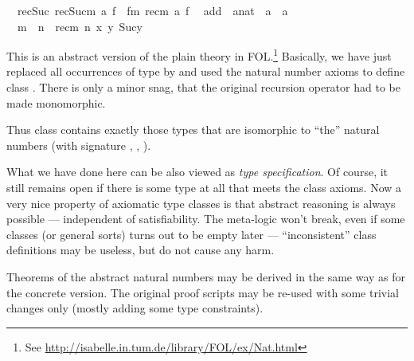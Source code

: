 \begin{isabellebody}
\ \ rec{\isacharunderscore}Suc{\isacharcolon}\ {\isachardoublequote}rec{\isacharparenleft}Suc{\isacharparenleft}m{\isacharparenright}{\isacharcomma}\ a{\isacharcomma}\ f{\isacharparenright}\ {\isacharequal}\ f{\isacharparenleft}m{\isacharcomma}\ rec{\isacharparenleft}m{\isacharcomma}\ a{\isacharcomma}\ f{\isacharparenright}{\isacharparenright}{\isachardoublequote}\isanewline
\isanewline
{}\isanewline
\ \ add\ {\isacharcolon}{\isacharcolon}\ {\isachardoublequote}{\isacharprime}a{\isacharcolon}{\isacharcolon}nat\ {\isasymRightarrow}\ {\isacharprime}a\ {\isasymRightarrow}\ {\isacharprime}a{\isachardoublequote}\ \ \ \ {\isacharparenleft}\ {\isachardoublequote}{\isacharplus}{\isachardoublequote}\ {}{}{\isacharparenright}\isanewline
\ \ {\isachardoublequote}m\ {\isacharplus}\ n\ {\isasymequiv}\ rec{\isacharparenleft}m{\isacharcomma}\ n{\isacharcomma}\ {\isasymlambda}x\ y{\isachardot}\ Suc{\isacharparenleft}y{\isacharparenright}{\isacharparenright}{\isachardoublequote}%
\begin{isamarkuptext}%
This is an abstract version of the plain  theory in
 FOL.\footnote{See
 \url{http://isabelle.in.tum.de/library/FOL/ex/Nat.html}} Basically,
 we have just replaced all occurrences of type  by  and used the natural number axioms to define class .
 There is only a minor snag, that the original recursion operator
  had to be made monomorphic.

 Thus class  contains exactly those types \isa{{\isasymtau}} that
 are isomorphic to ``the'' natural numbers (with signature \isa{{\isasymzero}}, , ).

 \medskip What we have done here can be also viewed as \emph{type
 specification}.  Of course, it still remains open if there is some
 type at all that meets the class axioms.  Now a very nice property of
 axiomatic type classes is that abstract reasoning is always possible
 --- independent of satisfiability.  The meta-logic won't break, even
 if some classes (or general sorts) turns out to be empty later ---
 ``inconsistent'' class definitions may be useless, but do not cause
 any harm.

 Theorems of the abstract natural numbers may be derived in the same
 way as for the concrete version.  The original proof scripts may be
 re-used with some trivial changes only (mostly adding some type
 constraints).%
\end{isamarkuptext}%
\end{isabellebody}%
